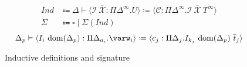 \begin{figure}
\centering
\begin{align*}
\textit{Ind} &\Coloneqq \Delta \vdash \langle \mathcal{I}\ \overline{\mathcal{X}}: \Pi\Delta^\infty. U \rangle \coloneqq \langle \mathcal{C}: \Pi\Delta^\infty. \mathcal{I}\ \overline{\mathcal{X}}\ \overline{T^\infty} \rangle \\
\Sigma &\Coloneqq \square \mid \Sigma (\textit{Ind})
\end{align*}
\begin{equation*}
\Delta_p \vdash \langle I_i\ \dom{\Delta_p}: \Pi\Delta_{a_i}. \varw_i \rangle \coloneqq \langle c_j: \Pi\Delta_j. I_{k_j}\ \dom{\Delta_p}\ \overline{t}_j \rangle
\end{equation*}
\caption{Inductive definitions and signature}
\label{fig:inductives}
\end{figure}